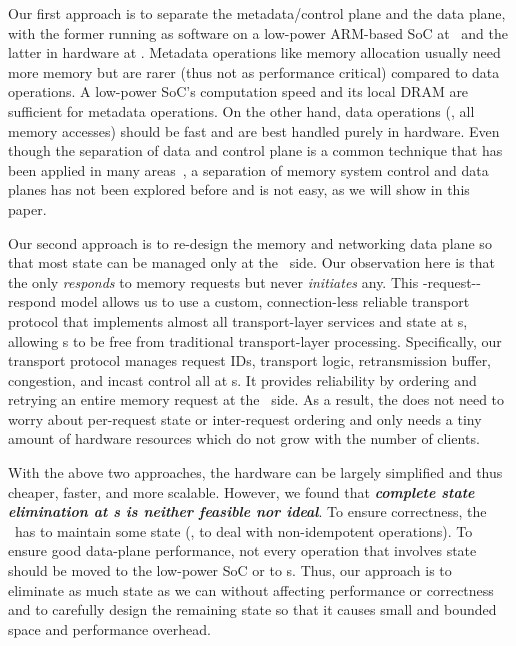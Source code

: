 Our first approach is to separate the metadata/control plane and the data plane, with the former running as software on a low-power ARM-based SoC at \MN\ and the latter in hardware at \MN. 
Metadata operations like memory allocation usually need more memory but are rarer (thus not as performance critical) compared to data operations.
A low-power SoC's computation speed and its local DRAM are sufficient for metadata operations.
On the other hand, data operations (\ie, all memory accesses) should be fast and are best handled purely in hardware. 
Even though the separation of data and control plane is a common technique that has been applied in many areas~\cite{4d-sdn,netvirt,arrakis}, a separation of memory system control and data planes has not been explored before and is not easy, as we will show in this paper.

Our second approach is to re-design the memory and networking data plane so that most state can be managed only at the \CN\ side.
Our observation here is that the \MN{} only {\em responds} to memory requests but never {\em initiates} any.
This \CN-request-\MN-respond model allows us to use a custom, connection-less reliable transport protocol that implements almost all transport-layer services and state at \CN{}s, allowing \MN{}s to be free from traditional transport-layer processing.
Specifically, our transport protocol manages request IDs, transport logic, retransmission buffer, congestion, and incast control all at \CN{}s. It provides 
reliability by ordering and retrying an entire memory request at the \CN\ side.
As a result, the \MN{} does not need to worry about per-request state or inter-request ordering and only needs a tiny amount of hardware resources which do not grow with the number of clients.
 
With the above two approaches, the hardware can be largely simplified and thus cheaper, faster, and more scalable.
However, we found that \textit{\textbf{complete state elimination at \MN{}s is neither feasible nor ideal}}. To ensure correctness, the \MN\ has to maintain some state (\eg, to deal with non-idempotent operations). To ensure good data-plane performance, not every operation that involves state should be moved to the low-power SoC or to \CN{}s.
Thus, our approach is to eliminate as much state as we can without affecting performance or correctness and to carefully design the remaining state so that it causes small and bounded space and performance overhead.

